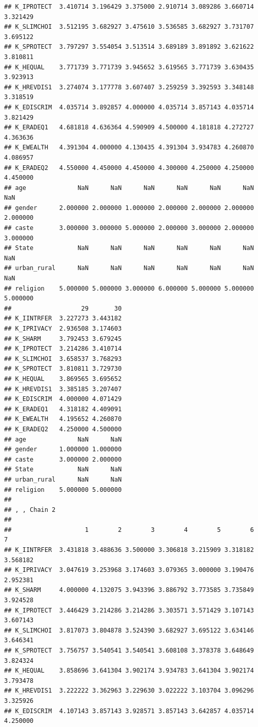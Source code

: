 \documentclass[
]{article}
\begin{document}
\begin{verbatim}
## K_IPROTECT  3.410714 3.196429 3.375000 2.910714 3.089286 3.660714 3.321429
## K_SLIMCHOI  3.512195 3.682927 3.475610 3.536585 3.682927 3.731707 3.695122
## K_SPROTECT  3.797297 3.554054 3.513514 3.689189 3.891892 3.621622 3.810811
## K_HEQUAL    3.771739 3.771739 3.945652 3.619565 3.771739 3.630435 3.923913
## K_HREVDIS1  3.274074 3.177778 3.607407 3.259259 3.392593 3.348148 3.318519
## K_EDISCRIM  4.035714 3.892857 4.000000 4.035714 3.857143 4.035714 3.821429
## K_ERADEQ1   4.681818 4.636364 4.590909 4.500000 4.181818 4.272727 4.363636
## K_EWEALTH   4.391304 4.000000 4.130435 4.391304 3.934783 4.260870 4.086957
## K_ERADEQ2   4.550000 4.450000 4.450000 4.300000 4.250000 4.250000 4.450000
## age              NaN      NaN      NaN      NaN      NaN      NaN      NaN
## gender      2.000000 2.000000 1.000000 2.000000 2.000000 2.000000 2.000000
## caste       3.000000 3.000000 5.000000 2.000000 3.000000 2.000000 3.000000
## State            NaN      NaN      NaN      NaN      NaN      NaN      NaN
## urban_rural      NaN      NaN      NaN      NaN      NaN      NaN      NaN
## religion    5.000000 5.000000 3.000000 6.000000 5.000000 5.000000 5.000000
##                   29       30
## K_IINTRFER  3.227273 3.443182
## K_IPRIVACY  2.936508 3.174603
## K_SHARM     3.792453 3.679245
## K_IPROTECT  3.214286 3.410714
## K_SLIMCHOI  3.658537 3.768293
## K_SPROTECT  3.810811 3.729730
## K_HEQUAL    3.869565 3.695652
## K_HREVDIS1  3.385185 3.207407
## K_EDISCRIM  4.000000 4.071429
## K_ERADEQ1   4.318182 4.409091
## K_EWEALTH   4.195652 4.260870
## K_ERADEQ2   4.250000 4.500000
## age              NaN      NaN
## gender      1.000000 1.000000
## caste       3.000000 2.000000
## State            NaN      NaN
## urban_rural      NaN      NaN
## religion    5.000000 5.000000
## 
## , , Chain 2
## 
##                    1        2        3        4        5        6        7
## K_IINTRFER  3.431818 3.488636 3.500000 3.306818 3.215909 3.318182 3.568182
## K_IPRIVACY  3.047619 3.253968 3.174603 3.079365 3.000000 3.190476 2.952381
## K_SHARM     4.000000 4.132075 3.943396 3.886792 3.773585 3.735849 3.924528
## K_IPROTECT  3.446429 3.214286 3.214286 3.303571 3.571429 3.107143 3.607143
## K_SLIMCHOI  3.817073 3.804878 3.524390 3.682927 3.695122 3.634146 3.646341
## K_SPROTECT  3.756757 3.540541 3.540541 3.608108 3.378378 3.648649 3.824324
## K_HEQUAL    3.858696 3.641304 3.902174 3.934783 3.641304 3.902174 3.793478
## K_HREVDIS1  3.222222 3.362963 3.229630 3.022222 3.103704 3.096296 3.325926
## K_EDISCRIM  4.107143 3.857143 3.928571 3.857143 3.642857 4.035714 4.250000

\end{verbatim}
\end{document}
